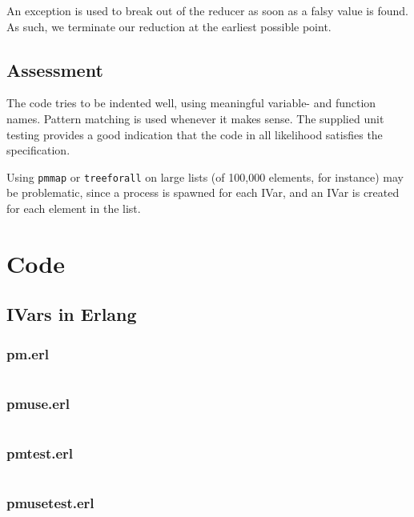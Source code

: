 \documentclass[11pt,a4paper]{article}
\begin{document}
An exception is used to break out of the reducer as soon as a falsy value is
found. As such, we terminate our reduction at the earliest possible point.

\subsection{Assessment}
The code tries to be indented well, using meaningful variable- and function
names. Pattern matching is used whenever it makes sense. The supplied unit
testing provides a good indication that the code in all likelihood satisfies
the specification.

Using \texttt{pmmap} or \texttt{treeforall} on large lists (of 100,000
elements, for instance) may be problematic, since a process is spawned for
each IVar, and an IVar is created for each element in the list.

\appendix
\section{Code}
\subsection{IVars in Erlang}
\subsubsection{pm.erl}
\inputminted{erlang}{src/pm/pm.erl}
\subsubsection{pmuse.erl}
\inputminted{erlang}{src/pm/pmuse.erl}
\subsubsection{pmtest.erl}
\inputminted{erlang}{src/pm/pmtest.erl}
\subsubsection{pmusetest.erl}
\inputminted{erlang}{src/pm/pmusetest.erl}
\end{document}

